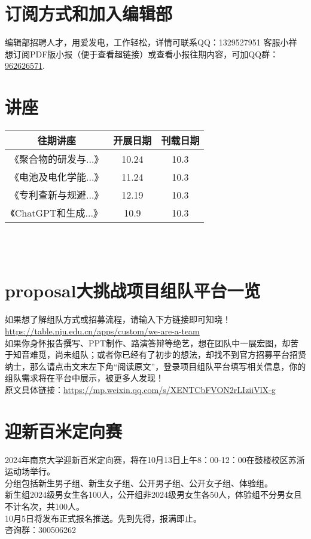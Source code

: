 \documentclass[letterpaper, 12pt]{article}
\begin{document}
\begin{multicols}{2}
\section{订阅方式和加入编辑部}
编辑部招聘人才，用爱发电，工作轻松，详情可联系QQ：1329527951 客服小祥\\想订阅PDF版小报（便于查看超链接）或查看小报往期内容，可加QQ群：\href{https://qm.qq.com/q/FGX1VYCrGS}{962626571}.
\section{讲座}
\begin{tabular}{|c|c|c|}
    \hline
    往期讲座 & 开展日期 & 刊载日期\\
    \hline\hline
    《聚合物的研发与...》 & 10.24 & 10.3\\
    《电池及电化学能...》 & 11.24 & 10.3\\
    《专利查新与规避...》 & 12.19 & 10.3\\
    《ChatGPT和生成...》 & 10.9 & 10.3\\
      \hline
\end{tabular}\\\\
\section{proposal大挑战项目组队平台一览}
如果想了解组队方式或招募流程，请输入下方链接即可知晓！\url{https://table.nju.edu.cn/apps/custom/we-are-a-team}\\
如果你身怀报告撰写、PPT制作、路演答辩等绝艺，想在团队中一展宏图，却苦于知音难觅，尚未组队；或者你已经有了初步的想法，却找不到官方招募平台招贤纳士，那么请点击文末左下角“阅读原文”，登录项目组队平台填写相关信息，你的组队需求将在平台中展示，被更多人发现！\\
原文具体链接：\url{https://mp.weixin.qq.com/s/XENTCbFVON2rLIziiVlX-g}

\section{迎新百米定向赛}
2024年南京大学迎新百米定向赛，将在10月13日上午8：00-12：00在鼓楼校区苏浙运动场举行。\\
分组包括新生男子组、新生女子组、公开男子组、公开女子组、体验组。\\
新生组2024级男女生各100人，公开组非2024级男女生各50人，体验组不分男女且不计名次，共100人。\\
10月5日将发布正式报名推送。先到先得，报满即止。\\
咨询群：300506262



\end{multicols}
\end{document}
